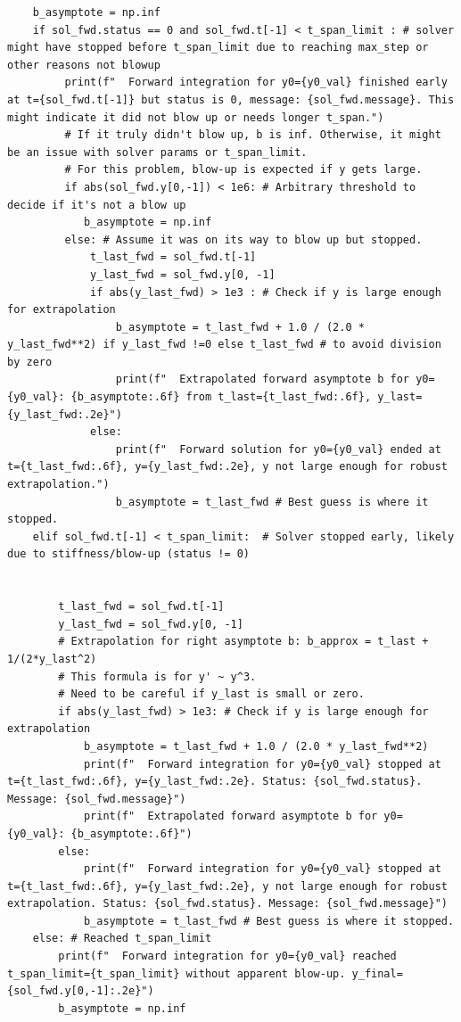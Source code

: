 \documentclass{article}
\begin{document}
\begin{verbatim}
    b_asymptote = np.inf
    if sol_fwd.status == 0 and sol_fwd.t[-1] < t_span_limit : # solver might have stopped before t_span_limit due to reaching max_step or other reasons not blowup
         print(f"  Forward integration for y0={y0_val} finished early at t={sol_fwd.t[-1]} but status is 0, message: {sol_fwd.message}. This might indicate it did not blow up or needs longer t_span.")
         # If it truly didn't blow up, b is inf. Otherwise, it might be an issue with solver params or t_span_limit.
         # For this problem, blow-up is expected if y gets large.
         if abs(sol_fwd.y[0,-1]) < 1e6: # Arbitrary threshold to decide if it's not a blow up
            b_asymptote = np.inf
         else: # Assume it was on its way to blow up but stopped.
             t_last_fwd = sol_fwd.t[-1]
             y_last_fwd = sol_fwd.y[0, -1]
             if abs(y_last_fwd) > 1e3 : # Check if y is large enough for extrapolation
                 b_asymptote = t_last_fwd + 1.0 / (2.0 * y_last_fwd**2) if y_last_fwd !=0 else t_last_fwd # to avoid division by zero
                 print(f"  Extrapolated forward asymptote b for y0={y0_val}: {b_asymptote:.6f} from t_last={t_last_fwd:.6f}, y_last={y_last_fwd:.2e}")
             else:
                 print(f"  Forward solution for y0={y0_val} ended at t={t_last_fwd:.6f}, y={y_last_fwd:.2e}, y not large enough for robust extrapolation.")
                 b_asymptote = t_last_fwd # Best guess is where it stopped.
    elif sol_fwd.t[-1] < t_span_limit:  # Solver stopped early, likely due to stiffness/blow-up (status != 0)


        t_last_fwd = sol_fwd.t[-1]
        y_last_fwd = sol_fwd.y[0, -1]
        # Extrapolation for right asymptote b: b_approx = t_last + 1/(2*y_last^2)
        # This formula is for y' ~ y^3.
        # Need to be careful if y_last is small or zero.
        if abs(y_last_fwd) > 1e3: # Check if y is large enough for extrapolation
            b_asymptote = t_last_fwd + 1.0 / (2.0 * y_last_fwd**2)
            print(f"  Forward integration for y0={y0_val} stopped at t={t_last_fwd:.6f}, y={y_last_fwd:.2e}. Status: {sol_fwd.status}. Message: {sol_fwd.message}")
            print(f"  Extrapolated forward asymptote b for y0={y0_val}: {b_asymptote:.6f}")
        else:
            print(f"  Forward integration for y0={y0_val} stopped at t={t_last_fwd:.6f}, y={y_last_fwd:.2e}, y not large enough for robust extrapolation. Status: {sol_fwd.status}. Message: {sol_fwd.message}")
            b_asymptote = t_last_fwd # Best guess is where it stopped.
    else: # Reached t_span_limit
        print(f"  Forward integration for y0={y0_val} reached t_span_limit={t_span_limit} without apparent blow-up. y_final={sol_fwd.y[0,-1]:.2e}")
        b_asymptote = np.inf







\end{verbatim}
\end{document}
